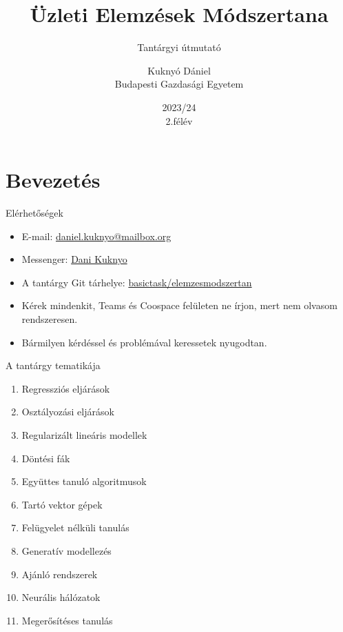 \documentclass[english, aspectratio=169]{beamer}
\newcommand\makebeamertitle{\frame{\maketitle}}
\begin{document}
\section{Bevezetés}
\title[]{Üzleti Elemzések Módszertana}
\subtitle{Tantárgyi útmutató}
\author[Kuknyó Dániel]{Kuknyó Dániel\\Budapesti Gazdasági Egyetem}
\date{2023/24\\2.félév}
\makebeamertitle

\begin{frame}{Elérhetőségek}
\begin{itemize}
	\item E-mail: \href{mailto:daniel.kuknyo@mailbox.org}{daniel.kuknyo@mailbox.org}
	\item Messenger: \href{https://www.facebook.com/dani.kkny/}{Dani Kuknyo}
	\item A tantárgy Git tárhelye: \href{https://github.com/basictask/Elemzesmodszertan}{basictask/elemzesmodszertan}
	\item Kérek mindenkit, Teams és Coospace felületen ne írjon, mert nem olvasom rendszeresen. 
	\item Bármilyen kérdéssel és problémával keressetek nyugodtan. 
\end{itemize}
\end{frame}

\begin{frame}{A tantárgy tematikája}
\begin{enumerate}
	\item Regressziós eljárások
	\item Osztályozási eljárások
	\item Regularizált lineáris modellek
	\item Döntési fák
	\item Együttes tanuló algoritmusok
	\item Tartó vektor gépek
	\item Felügyelet nélküli tanulás
	\item Generatív modellezés
	\item Ajánló rendszerek
	\item Neurális hálózatok 
	\item Megerősítéses tanulás
\end{enumerate}
\end{frame}
\end{document}
